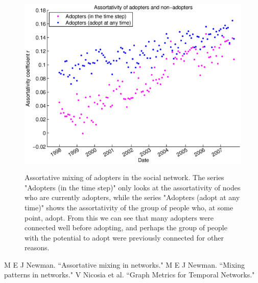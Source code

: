 \documentclass[12pt]{article}
\begin{document}
\begin{figure}[H]
\includegraphics[trim = 0cm 0cm 0cm 0cm, width = .9\textwidth]{Graficos/adoptAssort.eps}
\label{fig:adoptAssort}
\caption{Assortative mixing of adopters in the social network. The series "Adopters (in the time step)" only looks at the assortativity of nodes who are currently adopters, while the series "Adopters (adopt at any time)" shows the assortativity of the group of people who, at some point, adopt. From this we can see that many adopters were connected well before adopting, and perhaps the group of people with the potential to adopt were previously connected for other reasons.}
\end{figure}


%
%

\begin{thebibliography}{99}
 M E J Newman. ``Assortative mixing in networks." 
 M E J Newman. ``Mixing patterns in networks."
 V Nicosia et al. ``Graph Metrics for Temporal Networks." 
\end{thebibliography}
\end{document}

